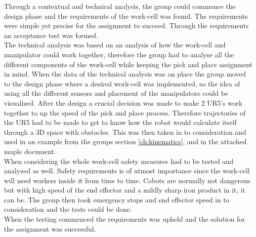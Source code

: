 Through a contextual and technical analysis, the group could commence the design phase and the  requirements of the work-cell was found. The requirements were simple yet precise for the assignment to succeed. Through the requirements an acceptance test was formed.\\
The technical analysis was based on an analysis of how the work-cell and manipulator could work together, therefore the group had to analyse all the different components of the work-cell while keeping the pick and place assignment in mind. When the data of the technical analysis was on place the group moved to the design phase where a desired work-cell was implemented, so the idea of using all the different sensors and placement of the manipulators could be visualized. After the design a crucial decision was made to make 2 UR5's work together to up the speed of the pick and place process. Therefore trajectories of the UR5 had to be made to get to know how the robot would calculate itself through a 3D space with obstacles. This was then taken in to consideration and used in an example from the groups section \ref{ch:kinematics}, and in the attached maple document.\\
When considering the whole work-cell safety measures had to be tested and analyzed as well. Safety requirements is of utmost importance since the work-cell will need workers inside it from time to time. Cobots are normally not dangerous but with high speed of the end effector and a mildly sharp iron product in it, it can be. The group then took emergency stops and end effector speed in to consideration and the tests could be done.\\
When the testing commenced the requirements was upheld and the solution for the assignment was successful. 